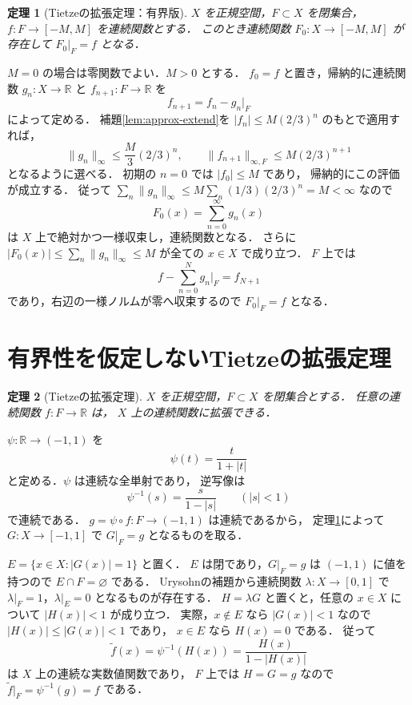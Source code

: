 \documentclass[a5paper,10pt,onecolumn]{jsarticle}
\makeatletter
\theoremstyle{mathnotetheorem}
\newtheorem{theorem}{定理}[section]
\renewcommand{\proofname}{証明}
\renewenvironment{proof}[1][\proofname]{%
  \par\pushQED{\qed}\normalfont\topsep4\p@\@plus2\p@\relax
  \trivlist\item[\hskip\labelsep\bfseries #1]\ignorespaces
}{\popQED\endtrivlist\@endpefalse}
\newcommand{\norm}[1]{\lVert #1\rVert}
\makeatother
\begin{document}
\begin{theorem}[Tietzeの拡張定理：有界版]\label{thm:tietze-bounded}
$X$ を正規空間，$F\subset X$ を閉集合，
$f:F\to[-M,M]$ を連続関数とする．
このとき連続関数 $F_0:X\to[-M,M]$ が存在して
$F_0|_F=f$ となる．
\end{theorem}
\begin{proof}
$M=0$ の場合は零関数でよい．$M>0$ とする．
$f_0=f$ と置き，帰納的に連続関数
$g_n:X\to\mathbb R$ と
$f_{n+1}:F\to\mathbb R$ を
\[
 f_{n+1}=f_n-g_n|_F
\]
によって定める．
補題\ref{lem:approx-extend}を
$|f_n|\le M(2/3)^n$ のもとで適用すれば，
\[
 \norm{g_n}_\infty\le\frac M3(2/3)^n,
 \qquad
 \norm{f_{n+1}}_{\infty,F}\le M(2/3)^{n+1}
\]
となるように選べる．
初期の $n=0$ では $|f_0|\le M$ であり，
帰納的にこの評価が成立する．
従って
$\sum_n\norm{g_n}_\infty
 \le M\sum_n(1/3)(2/3)^n=M<\infty$
なので
\[
 F_0(x)=\sum_{n=0}^\infty g_n(x)
\]
は $X$ 上で絶対かつ一様収束し，連続関数となる．
さらに
$|F_0(x)|\le\sum_n\norm{g_n}_\infty\le M$
が全ての $x\in X$ で成り立つ．
$F$ 上では
\[
 f-\sum_{n=0}^{N}g_n|_F=f_{N+1}
\]
であり，右辺の一様ノルムが零へ収束するので
$F_0|_F=f$ となる．
\end{proof}

\section{有界性を仮定しないTietzeの拡張定理}

\begin{theorem}[Tietzeの拡張定理]\label{thm:tietze}
$X$ を正規空間，$F\subset X$ を閉集合とする．
任意の連続関数 $f:F\to\mathbb R$ は，
$X$ 上の連続関数に拡張できる．
\end{theorem}
\begin{proof}
$\psi:\mathbb R\to(-1,1)$ を
\[
 \psi(t)=\frac{t}{1+|t|}
\]
と定める．$\psi$ は連続な全単射であり，
逆写像は
\[
 \psi^{-1}(s)=\frac{s}{1-|s|}\qquad(|s|<1)
\]
で連続である．
$g=\psi\circ f:F\to(-1,1)$ は連続であるから，
定理\ref{thm:tietze-bounded}によって
$G:X\to[-1,1]$ で $G|_F=g$ となるものを取る．

$E=\{x\in X:|G(x)|=1\}$ と置く．
$E$ は閉であり，$G|_F=g$ は $(-1,1)$ に値を持つので
$E\cap F=\varnothing$ である．
Urysohnの補題から連続関数
$\lambda:X\to[0,1]$ で
$\lambda|_F=1$，$\lambda|_E=0$
となるものが存在する．
$H=\lambda G$ と置くと，任意の $x\in X$ について
$|H(x)|<1$ が成り立つ．
実際，$x\notin E$ なら $|G(x)|<1$ なので
$|H(x)|\le|G(x)|<1$ であり，
$x\in E$ なら $H(x)=0$ である．
従って
\[
 \widetilde f(x)=\psi^{-1}(H(x))
 =\frac{H(x)}{1-|H(x)|}
\]
は $X$ 上の連続な実数値関数であり，
$F$ 上では $H=G=g$ なので
$\widetilde f|_F=\psi^{-1}(g)=f$ である．
\end{proof}
\end{document}
